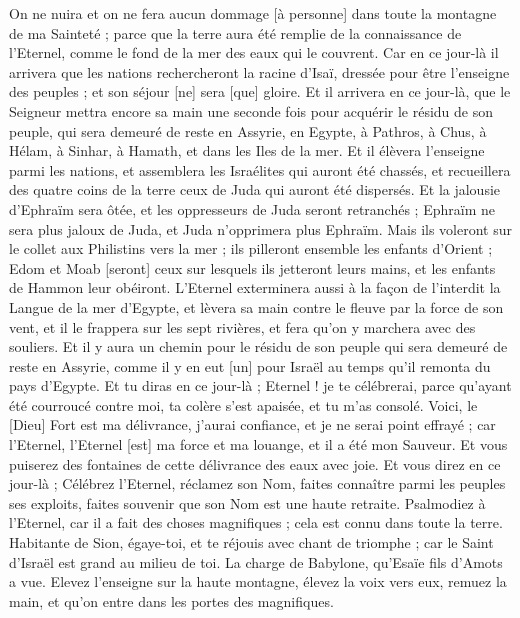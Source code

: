 \begin{multicols}{2}
On ne nuira et on ne fera aucun dommage [à personne] dans toute la montagne de ma Sainteté ; parce que la terre aura été remplie de la connaissance de l'Eternel, comme le fond de la mer des eaux qui le couvrent.
Car en ce jour-là il arrivera que les nations rechercheront la racine d'Isaï, dressée pour être l'enseigne des peuples ; et son séjour [ne] sera [que] gloire.
Et il arrivera en ce jour-là, que le Seigneur mettra encore sa main une seconde fois pour acquérir le résidu de son peuple, qui sera demeuré de reste en Assyrie, en Egypte, à Pathros, à Chus, à Hélam, à Sinhar, à Hamath, et dans les Iles de la mer.
Et il élèvera l'enseigne parmi les nations, et assemblera les Israélites qui auront été chassés, et recueillera des quatre coins de la terre ceux de Juda qui auront été dispersés.
Et la jalousie d'Ephraïm sera ôtée, et les oppresseurs de Juda seront retranchés ; Ephraïm ne sera plus jaloux de Juda, et Juda n'opprimera plus Ephraïm.
Mais ils voleront sur le collet aux Philistins vers la mer ; ils pilleront ensemble les enfants d'Orient ; Edom et Moab [seront] ceux sur lesquels ils jetteront leurs mains, et les enfants de Hammon leur obéiront.
L'Eternel exterminera aussi à la façon de l'interdit la Langue de la mer d'Egypte, et lèvera sa main contre le fleuve par la force de son vent, et il le frappera sur les sept rivières, et fera qu'on y marchera avec des souliers.
Et il y aura un chemin pour le résidu de son peuple qui sera demeuré de reste en Assyrie, comme il y en eut [un] pour Israël au temps qu'il remonta du pays d'Egypte.
\VerseOne{}Et tu diras en ce jour-là ; Eternel ! je te célébrerai, parce qu'ayant été courroucé contre moi, ta colère s'est apaisée, et tu m'as consolé.
Voici, le [Dieu] Fort est ma délivrance, j'aurai confiance, et je ne serai point effrayé ; car l'Eternel, l'Eternel [est] ma force et ma louange, et il a été mon Sauveur.
Et vous puiserez des fontaines de cette délivrance des eaux avec joie.
Et vous direz en ce jour-là ; Célébrez l'Eternel, réclamez son Nom, faites connaître parmi les peuples ses exploits, faites souvenir que son Nom est une haute retraite.
Psalmodiez à l'Eternel, car il a fait des choses magnifiques ; cela est connu dans toute la terre.
Habitante de Sion, égaye-toi, et te réjouis avec chant de triomphe ; car le Saint d'Israël est grand au milieu de toi.
\VerseOne{}La charge de Babylone, qu'Esaïe fils d'Amots a vue.
Elevez l'enseigne sur la haute montagne, élevez la voix vers eux, remuez la main, et qu'on entre dans les portes des magnifiques.

\end{multicols}
